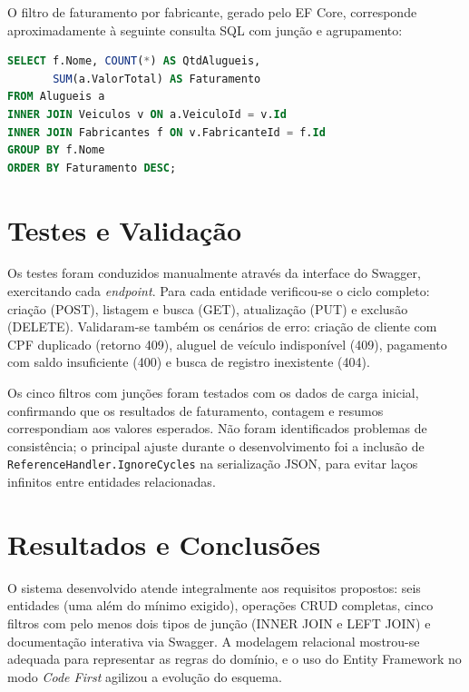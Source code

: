 \documentclass[12pt]{article}
\begin{document}
O filtro de faturamento por fabricante, gerado pelo EF Core, corresponde aproximadamente à seguinte consulta SQL com junção e agrupamento:

\begin{lstlisting}[language=SQL,caption={Faturamento por fabricante (INNER JOIN + GROUP BY).}]
SELECT f.Nome, COUNT(*) AS QtdAlugueis,
       SUM(a.ValorTotal) AS Faturamento
FROM Alugueis a
INNER JOIN Veiculos v ON a.VeiculoId = v.Id
INNER JOIN Fabricantes f ON v.FabricanteId = f.Id
GROUP BY f.Nome
ORDER BY Faturamento DESC;
\end{lstlisting}

\section{Testes e Validação}

Os testes foram conduzidos manualmente através da interface do Swagger, exercitando cada \emph{endpoint}. Para cada entidade verificou-se o ciclo completo: criação (POST), listagem e busca (GET), atualização (PUT) e exclusão (DELETE). Validaram-se também os cenários de erro: criação de cliente com CPF duplicado (retorno 409), aluguel de veículo indisponível (409), pagamento com saldo insuficiente (400) e busca de registro inexistente (404).

Os cinco filtros com junções foram testados com os dados de carga inicial, confirmando que os resultados de faturamento, contagem e resumos correspondiam aos valores esperados. Não foram identificados problemas de consistência; o principal ajuste durante o desenvolvimento foi a inclusão de \texttt{ReferenceHandler.IgnoreCycles} na serialização JSON, para evitar laços infinitos entre entidades relacionadas.

\section{Resultados e Conclusões}

O sistema desenvolvido atende integralmente aos requisitos propostos: seis entidades (uma além do mínimo exigido), operações CRUD completas, cinco filtros com pelo menos dois tipos de junção (INNER JOIN e LEFT JOIN) e documentação interativa via Swagger. A modelagem relacional mostrou-se adequada para representar as regras do domínio, e o uso do Entity Framework no modo \emph{Code First} agilizou a evolução do esquema.
\end{document}
